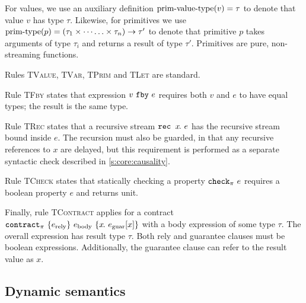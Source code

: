 \documentclass[a4paper,UKenglish,cleveref, autoref, thm-restate,anonymous]{lipics-v2021}
\begin{document}
For values, we use an auxiliary definition $\text{prim-value-type}(v) = \tau$ to denote that value $v$ has type $\tau$.
Likewise, for primitives we use $\text{prim-type}(p) = (\tau_1 \times \cdots \hdots \times \tau_n) \to \tau'$ to denote that primitive $p$ takes arguments of type $\tau_i$ and returns a result of type $\tau'$.
Primitives are pure, non-streaming functions.

Rules \textsc{TValue}, \textsc{TVar}, \textsc{TPrim} and \textsc{TLet} are standard.

Rule \textsc{TFby} states that expression $v~\texttt{fby}~e$ requires both $v$ and $e$ to have equal types; the result is the same type.

Rule \textsc{TRec} states that a recursive stream $\texttt{rec~} x\hspace{-0.1em}.~e$ has the recursive stream bound inside $e$.
The recursion must also be guarded, in that any recursive references to $x$ are delayed, but this requirement is performed as a separate syntactic check described in \autoref{s:core:causality}.

Rule \textsc{TCheck} states that statically checking a property $\texttt{check}_{\pi}~e$ requires a boolean property $e$ and returns unit.

Finally, rule \textsc{TContract} applies for a contract $\texttt{contract}_{\pi}~\{e_{\text{rely}}\}~e_{\text{body}}~\{x\hspace{-0.1em}.~e_{\text{guar}}[x]\}$ with a body expression of some type $\tau$.
The overall expression has result type $\tau$.
Both rely and guarantee clauses must be boolean expressions.
Additionally, the guarantee clause can refer to the result value as $x$.

\subsection{Dynamic semantics}
\label{s:core:dynamic}
\end{document}
